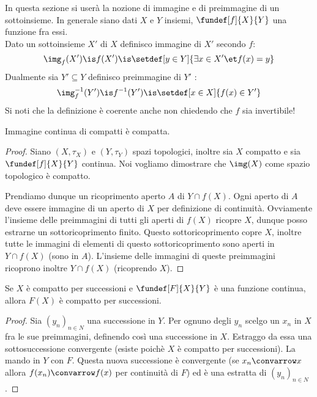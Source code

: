 

In questa sezione si userà la nozione di immagine e di preimmagine di un sottoinsieme. In generale siano dati $X$ e $Y$ insiemi, $\fundef[f]{X}{Y}$ una funzione fra essi.\\
Dato un sottoinsieme $X'$ di $X$ definisco immagine di $X'$ secondo $f$: 
\begin{equation*}
\img_f(X') \is f(X') \is \setdef[y \in Y]{\exists x \in X' \et f(x) = y} 
\end{equation*}
Dualmente sia $Y'\subseteq Y$ definisco preimmagine di $Y'$ : 
\begin{equation*}
\img_f^{-1}(Y') \is f^{-1}(Y') \is \setdef[x\in X]{f(x)\in Y'}
\end{equation*}
Si noti che la definizione è coerente anche non chiedendo che $f$ sia invertibile!
\begin{lemma}
Immagine continua di compatti è compatta.
\end{lemma}

\begin{proof}
Siano $(X, \tau_X)$ e $(Y, \tau_Y)$ spazi topologici, inoltre sia $X$ compatto e sia $\fundef[f]{X}{Y}$ continua. Noi vogliamo dimostrare che $\img(X)$ come spazio topologico è compatto.

Prendiamo dunque un ricoprimento aperto $A$ di $Y\cap f(X)$. 
Ogni aperto di $A$ deve essere immagine di un aperto di $X$ per definizione di continuità. 
Ovviamente l'insieme delle preimmagini di tutti gli aperti di $f(X)$ ricopre $X$, dunque posso estrarne un sottoricoprimento finito. Questo sottoricoprimento copre $X$, inoltre tutte le immagini di elementi di questo sottoricoprimento sono aperti in $Y\cap f(X)$ (sono in $A$). L'insieme delle immagini di queste preimmagini ricoprono inoltre $Y\cap f(X)$ (ricoprendo $X$).
\end{proof}

\begin{lemma}
Se $X$ è compatto per successioni e $\fundef[F]{X}{Y}$ è una funzione continua, allora $F(X)$ è compatto per successioni.
\end{lemma}
\begin{proof}
Sia $(y_n)_{n\in N}$ una successione in $Y$. Per ognuno degli $y_n$ scelgo un $x_n$ in $X$ fra le sue preimmagini, definendo così una successione in $X$. Estraggo da essa una sottosuccessione convergente (esiste poichè $X$ è compatto per successioni). La mando in $Y$ con $F$. Questa nuova successione è convergente (se $x_n \convarrow x$ allora $f(x_n)\convarrow f(x)$ per continuità di $F$) ed è una estratta di   $(y_n)_{n\in N}$.
\end{proof}


